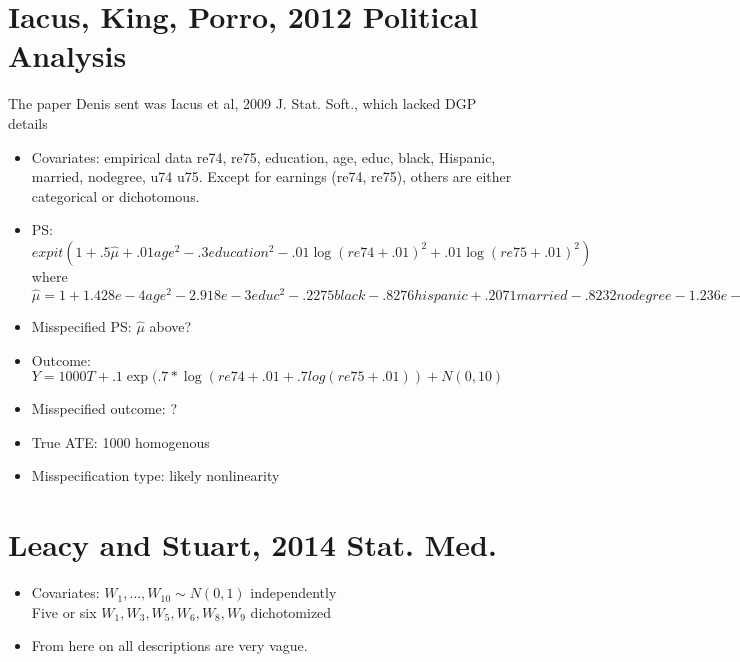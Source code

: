 \documentclass{article}
\begin{document}
\section{Iacus, King, Porro, 2012 Political Analysis}
{\color{red} The paper Denis sent was Iacus et al, 2009 J. Stat. Soft., which lacked DGP details}
\begin{itemize}
\item Covariates: empirical data re74, re75, education, age, educ, black, Hispanic, married, nodegree, u74 u75.  Except for earnings (re74, re75), others are either categorical or dichotomous. 
\item PS: $expit(1+.5\hat \mu + .01age^2 -.3 education^2 - .01\log(re74+.01)^2 + .01\log(re75+.01)^2)$ where \\
$\hat\mu = 1+1.428e-4 age^2 -2.918e-3 educ^2 - .2275black - .8276 hispanic + .2071 married - .8232 nodegree -1.236e-9 re74^2 + 5.868e-10 re75^2 - .04328 u74 - .3804 u75$
\item Misspecified PS: {\color{red} $\hat \mu$ above?}
\item Outcome: $Y = 1000T + .1\exp(.7*\log(re74+.01 + .7log(re75+.01)) + N(0, 10)$
\item Misspecified outcome: {\color{red} ?}
\item True ATE: 1000 homogenous
\item Misspecification type: {\color{red} likely nonlinearity}
\end{itemize}

\section{Leacy and Stuart, 2014 Stat. Med.}
\begin{itemize}
\item Covariates: $W_1, \ldots, W_{10} \sim N(0,1)$ independently \\
{\color{red} Five or six } $W_1, W_3, W_5, W_6, W_8, W_9$ dichotomized 
\item {\color{red} From here on all descriptions are very vague.}
\end{itemize}
\end{document}
